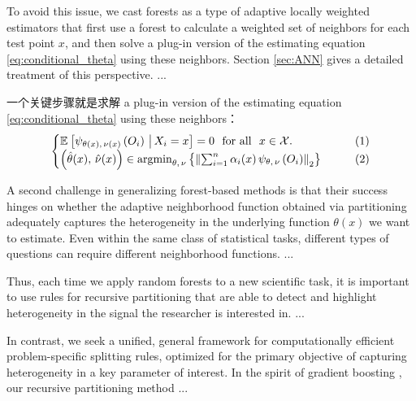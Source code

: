 \documentclass[aos]{imsart}
\theoremstyle{plain}
\theoremstyle{definition}
\theoremstyle{remark}
\begin{document}
\begin{CJK}{UTF8}{gbsn}
To avoid this issue, we cast forests as a type of adaptive locally weighted estimators that first use a forest to calculate a weighted set of neighbors for each test point $x$, and then solve a plug-in version of the estimating equation \eqref{eq:conditional_theta} using these neighbors. Section \ref{sec:ANN} gives a detailed treatment of this perspective. ...


一个关键步骤就是求解 a plug-in version of the estimating equation  \eqref{eq:conditional_theta} using these neighbors：
\begin{equation*}
\begin{cases}
\EE{\psi_{\theta(x), \, \nu(x)}\p{O_i} \cond X_i = x} = 0 \ \text{ for all } \ x \in \xx. &\qquad (1) \\
\p{\htheta(x), \, \hnu(x)} \in \argmin_{\theta, \, \nu} \cb{\Norm{\sum_{i = 1}^n \alpha_i(x) \, \psi_{\theta, \, \nu}\p{O_i}}_2} &\qquad (2) 
\end{cases}
\end{equation*}

A second challenge in generalizing forest-based methods is that their success hinges on whether the adaptive neighborhood function obtained via partitioning adequately captures the heterogeneity in the underlying function $\theta(x)$ we want to estimate.
Even within the same class of statistical tasks, different types of questions can require different neighborhood functions. ...

Thus, each time we apply random forests to a new scientific task, it is important to use rules for recursive partitioning that are able to detect and highlight heterogeneity in the signal the researcher is interested in. ...

In contrast, we seek a unified, general framework for computationally efficient problem-specific splitting rules,
optimized for the primary objective of capturing heterogeneity in a key parameter of interest.
In the spirit of gradient boosting \citep{friedman2001greedy}, our recursive partitioning
method ...






\end{CJK}
\end{document}
